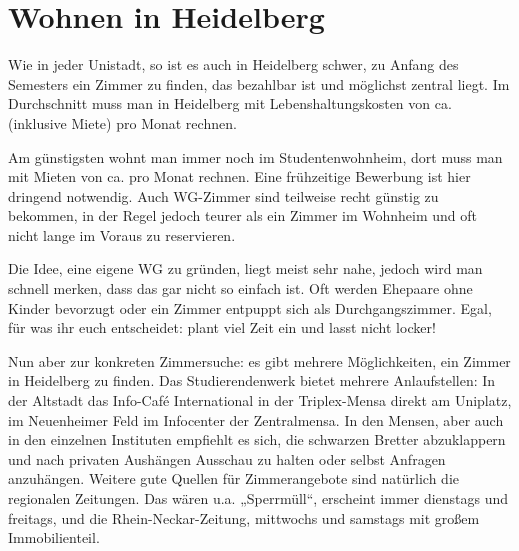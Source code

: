 \section{Wohnen in Heidelberg}


Wie in jeder Unistadt, so ist es auch in Heidelberg schwer, zu Anfang des Semesters ein Zimmer zu finden, das bezahlbar ist und möglichst zentral liegt. Im Durchschnitt muss man in Heidelberg mit Lebenshaltungskosten von ca. \lebenshaltungskosten (inklusive Miete) pro Monat rechnen.

Am günstigsten wohnt man immer noch im Studentenwohnheim, dort muss man mit Mieten von ca. \studentenwohnheim pro Monat rechnen. Eine frühzeitige Bewerbung ist hier dringend notwendig. Auch WG-Zimmer sind teilweise recht günstig zu bekommen, in der Regel jedoch teurer als ein Zimmer im Wohnheim und oft nicht lange im Voraus zu reservieren.

Die Idee, eine eigene WG zu gründen, liegt meist sehr nahe, jedoch wird man schnell merken, dass das gar nicht so einfach ist. Oft werden Ehepaare ohne Kinder bevorzugt oder ein Zimmer entpuppt sich als Durchgangszimmer. Egal, für was ihr euch entscheidet: plant viel Zeit ein und lasst nicht locker!

Nun aber zur konkreten Zimmersuche: es gibt mehrere Möglichkeiten, ein Zimmer in Heidelberg zu finden. Das Studierendenwerk bietet mehrere Anlaufstellen: In der Altstadt das Info-Café International in der Triplex-Mensa direkt am Uniplatz, im Neuenheimer Feld im Infocenter der Zentralmensa. In den Mensen, aber auch in den einzelnen Instituten empfiehlt es sich, die schwarzen Bretter abzuklappern und nach privaten Aushängen Ausschau zu halten oder selbst Anfragen anzuhängen. Weitere gute Quellen für Zimmerangebote sind natürlich die regionalen Zeitungen. Das wären u.a. „Sperrmüll“, erscheint immer dienstags und freitags, und die Rhein-Neckar-Zeitung, mittwochs und samstags mit großem Immobilienteil. %


